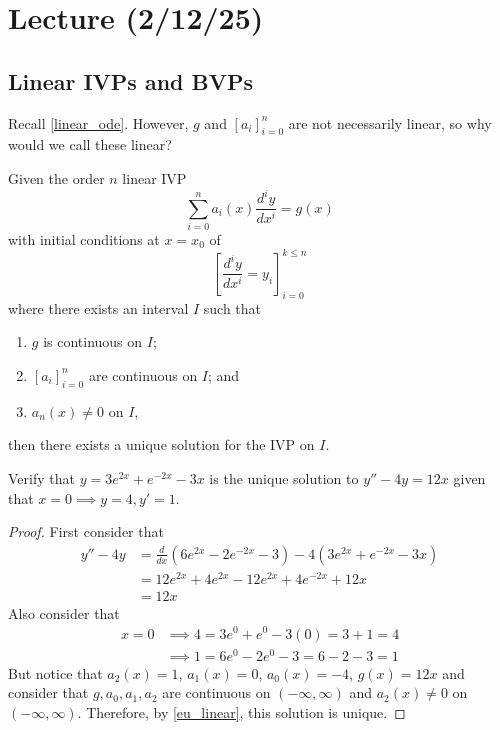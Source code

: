 \documentclass[notes]{subfiles}
\begin{document}
\setcounter{section}{7}
\section{Lecture (2/12/25)}

\subsection{Linear IVPs and BVPs}
Recall \cref{linear_ode}. However, $g$ and $[ a_i ]_{i = 0}^n$ are not necessarily linear, so why would we call these linear?

\begin{theorem}
    \label{eu_linear}
    Given the order $n$ linear IVP
    \[
        \sum_{i = 0}^n a_i(x)\frac{d^i y}{dx^i} = g(x)
    \]
    with initial conditions at $x = x_0$ of
    \[
        \left[ \frac{d^i y}{dx^i} = y_i \right]_{i = 0}^{k \leq n}
    \]
    where there exists an interval $I$ such that
    \begin{enumerate}[label = (\arabic*)]
        \item $g$ is continuous on $I$;
        \item $[ a_i ]_{i = 0}^n$ are continuous on $I$; and
        \item $a_n(x) \neq 0$ on $I$,
    \end{enumerate}
    then there exists a unique solution for the IVP on $I$.
\end{theorem}

\begin{exercise}
    Verify that $y = 3e^{2x} + e^{-2x} - 3x$ is the unique solution to $y'' - 4y = 12x$ given that $x = 0 \implies y = 4, y' = 1$.
\end{exercise}
\begin{proof}
    First consider that
    \begin{align*}
        y'' - 4y
        &= \frac{d}{dx}(6e^{2x} - 2e^{-2x} - 3) - 4(3e^{2x} + e^{-2x} - 3x) \\
        &= 12e^{2x} + 4e^{2x} - 12e^{2x} + 4e^{-2x} + 12x \\
        &= 12x
    \end{align*}
    Also consider that
    \begin{align*}
        x = 0
        &\implies 4 = 3e^{0} + e^{0} - 3(0) = 3 + 1 = 4 \\
        &\implies 1 = 6e^{0} - 2e^{0} - 3 = 6 - 2 - 3 = 1
    \end{align*}
    But notice that $a_2(x) = 1$, $a_1(x) = 0$, $a_0(x) = -4$, $g(x) = 12x$ and consider that $g, a_0, a_1, a_2$ are continuous on $(-\infty, \infty)$ and $a_2(x) \neq 0$ on $(-\infty, \infty)$. Therefore, by \cref{eu_linear}, this solution is unique.
\end{proof}
\end{document}
